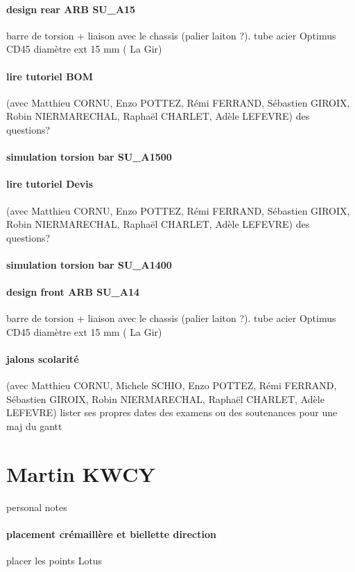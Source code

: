 \paragraph{design rear ARB SU\_A15} barre de torsion + liaison avec le chassis (palier laiton ?). tube acier Optimus CD45 diamètre ext 15 mm ( La Gir)
\paragraph{lire tutoriel BOM} (avec Matthieu CORNU, Enzo POTTEZ, Rémi FERRAND, Sébastien GIROIX, Robin NIERMARECHAL, Raphaël CHARLET, Adèle LEFEVRE) des questions?
\paragraph{simulation torsion bar SU\_A1500} 
\paragraph{lire tutoriel Devis} (avec Matthieu CORNU, Enzo POTTEZ, Rémi FERRAND, Sébastien GIROIX, Robin NIERMARECHAL, Raphaël CHARLET, Adèle LEFEVRE) des questions?
\paragraph{simulation torsion bar SU\_A1400} 
\paragraph{design front ARB SU\_A14} barre de torsion + liaison avec le chassis (palier laiton ?). tube acier Optimus CD45 diamètre ext 15 mm ( La Gir)
\paragraph{jalons scolarité} (avec Matthieu CORNU, Michele SCHIO, Enzo POTTEZ, Rémi FERRAND, Sébastien GIROIX, Robin NIERMARECHAL, Raphaël CHARLET, Adèle LEFEVRE) lister ses propres dates des examens ou des soutenances pour une maj du gantt

 
 \newpage \section*{Martin KWCY} 
 \par personal notes
\paragraph{placement crémaillère et biellette direction} placer les points Lotus
